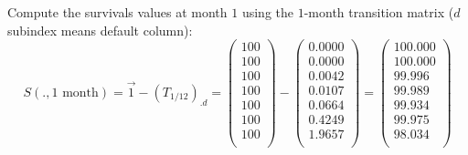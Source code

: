\documentclass[a4paper,12pt,final]{article}
\begin{document}
Compute the survivals values at month $1$ using the $1$-month transition matrix 
($d$ subindex means default column):
\begin{displaymath}
S(.,1 \textrm{ month}) = \vec{1} - (T_{1/12})_{.d} = 
\left( 
\begin{array}{c}
 100 \\
 100 \\
 100 \\
 100 \\
 100 \\
 100 \\
 100 \\
\end{array}
\right)
 - 
\left( 
\begin{array}{c}
 0.0000 \\
 0.0000 \\
 0.0042 \\
 0.0107 \\
 0.0664 \\
 0.4249 \\
 1.9657 \\
\end{array}
\right)
=
\left( 
\begin{array}{c}
 100.000 \\
 100.000 \\
  99.996 \\
  99.989 \\
  99.934 \\
  99.975 \\
  98.034 \\
\end{array}
\right)
\end{displaymath}
\end{document}
